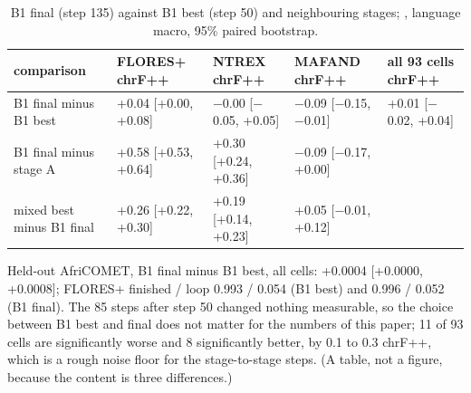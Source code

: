 \begin{table}[t]
\centering\footnotesize
\setlength{\tabcolsep}{4pt}
\caption{B1 final (step 135) against B1 best (step 50) and neighbouring stages; \chrfpp{}, language macro, 95\% paired bootstrap.}\label{tab:e20}
\begin{tabularx}{\linewidth}{@{}>{\raggedright\arraybackslash}Xllll@{}}
\toprule
comparison & FLORES+ chrF++ & NTREX chrF++ & MAFAND chrF++ & all 93 cells chrF++ \\
\midrule
B1 final minus B1 best & +0.04 [+0.00, +0.08] & \ensuremath{-}0.00 [\ensuremath{-}0.05, +0.05] & \ensuremath{-}0.09 [\ensuremath{-}0.15, \ensuremath{-}0.01] & +0.01 [\ensuremath{-}0.02, +0.04] \\
B1 final minus stage A & +0.58 [+0.53, +0.64] & +0.30 [+0.24, +0.36] & \ensuremath{-}0.09 [\ensuremath{-}0.17, +0.00] &  \\
mixed best minus B1 final & +0.26 [+0.22, +0.30] & +0.19 [+0.14, +0.23] & +0.05 [\ensuremath{-}0.01, +0.12] &  \\
\bottomrule
\end{tabularx}
\end{table}

Held-out AfriCOMET, B1 final minus B1 best, all cells: +0.0004 [+0.0000, +0.0008]; FLORES+ finished / loop 0.993 / 0.054 (B1 best) and 0.996 / 0.052 (B1 final). The 85 steps after step 50 changed nothing measurable, so the choice between B1 best and final does not matter for the numbers of this paper; 11 of 93 cells are significantly worse and 8 significantly better, by 0.1 to 0.3 chrF++, which is a rough noise floor for the stage-to-stage steps. (A table, not a figure, because the content is three differences.)

